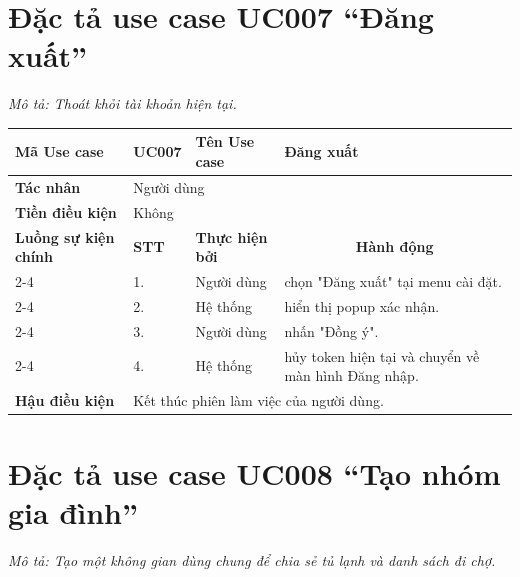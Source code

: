 \section{Đặc tả use case UC007 ``Đăng xuất''}
\textit{Mô tả: Thoát khỏi tài khoản hiện tại.}
\vspace{0.5cm}

\begingroup
\renewcommand{\arraystretch}{1.5}

\begin{longtable}{|p{2.7cm}|p{0.8cm}|p{2.6cm}|p{7.3cm}|}
\hline
\cellcolor[HTML]{D5F5E3}\textbf{Mã Use case} & \multicolumn{1}{l|}{UC007} & \cellcolor[HTML]{D5F5E3}\textbf{Tên Use case} & Đăng xuất \\ \hline
\cellcolor[HTML]{D5F5E3}\textbf{Tác nhân} & \multicolumn{3}{p{10.7cm}|}{Người dùng} \\ \hline
\cellcolor[HTML]{D5F5E3}\textbf{Tiền điều kiện} & \multicolumn{3}{p{10.7cm}|}{Không} \\ \hline

\cellcolor[HTML]{D5F5E3}\textbf{Luồng sự kiện chính} & \cellcolor[HTML]{FDEBD0}\textbf{STT} & \cellcolor[HTML]{FDEBD0}\textbf{Thực hiện bởi} & \multicolumn{1}{c|}{\cellcolor[HTML]{FDEBD0}\textbf{Hành động}} \\ \cline{2-4} 
\cellcolor[HTML]{D5F5E3} & 1. & Người dùng & chọn "Đăng xuất" tại menu cài đặt. \\ \cline{2-4} 
\cellcolor[HTML]{D5F5E3} & 2. & Hệ thống & hiển thị popup xác nhận. \\ \cline{2-4} 
\cellcolor[HTML]{D5F5E3} & 3. & Người dùng & nhấn "Đồng ý". \\ \cline{2-4} 
\cellcolor[HTML]{D5F5E3} & 4. & Hệ thống & hủy token hiện tại và chuyển về màn hình Đăng nhập. \\ \hline

\cellcolor[HTML]{D5F5E3}\textbf{Hậu điều kiện} & \multicolumn{3}{p{10.7cm}|}{Kết thúc phiên làm việc của người dùng.} \\ \hline
\end{longtable}
\endgroup

\section{Đặc tả use case UC008 ``Tạo nhóm gia đình''}
\textit{Mô tả: Tạo một không gian dùng chung để chia sẻ tủ lạnh và danh sách đi chợ.}
\vspace{0.5cm}

